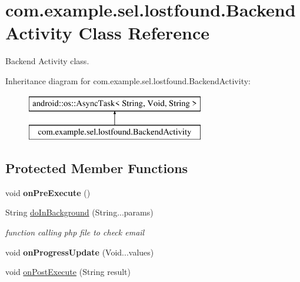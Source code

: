\hypertarget{classcom_1_1example_1_1sel_1_1lostfound_1_1BackendActivity}{\section{com.\-example.\-sel.\-lostfound.\-Backend\-Activity Class Reference}
\label{classcom_1_1example_1_1sel_1_1lostfound_1_1BackendActivity}
}


Backend Activity class.  


Inheritance diagram for com.\-example.\-sel.\-lostfound.\-Backend\-Activity\-:\begin{figure}[H]
\begin{center}
\leavevmode
\includegraphics[height=2.000000cm]{classcom_1_1example_1_1sel_1_1lostfound_1_1BackendActivity}
\end{center}
\end{figure}
\subsection*{Protected Member Functions}
\begin{DoxyCompactItemize}
\item 
\hypertarget{classcom_1_1example_1_1sel_1_1lostfound_1_1BackendActivity_a679cd5822b3d0b71b8a947eab9ff6c79}{void {\bfseries on\-Pre\-Execute} ()}\label{classcom_1_1example_1_1sel_1_1lostfound_1_1BackendActivity_a679cd5822b3d0b71b8a947eab9ff6c79}

\item 
String \hyperlink{classcom_1_1example_1_1sel_1_1lostfound_1_1BackendActivity_a4e9c46f342ba6738cdd50c9c75fb3ec7}{do\-In\-Background} (String...\-params)
\begin{DoxyCompactList}\small\item\em function calling php file to check email \end{DoxyCompactList}\item 
\hypertarget{classcom_1_1example_1_1sel_1_1lostfound_1_1BackendActivity_a6a2bf0fca03b89c35cd48befe848ee8d}{void {\bfseries on\-Progress\-Update} (Void...\-values)}\label{classcom_1_1example_1_1sel_1_1lostfound_1_1BackendActivity_a6a2bf0fca03b89c35cd48befe848ee8d}

\item 
void \hyperlink{classcom_1_1example_1_1sel_1_1lostfound_1_1BackendActivity_aa2e67993396f2bf74577e6ff84e16b44}{on\-Post\-Execute} (String result)
\end{DoxyCompactItemize}


